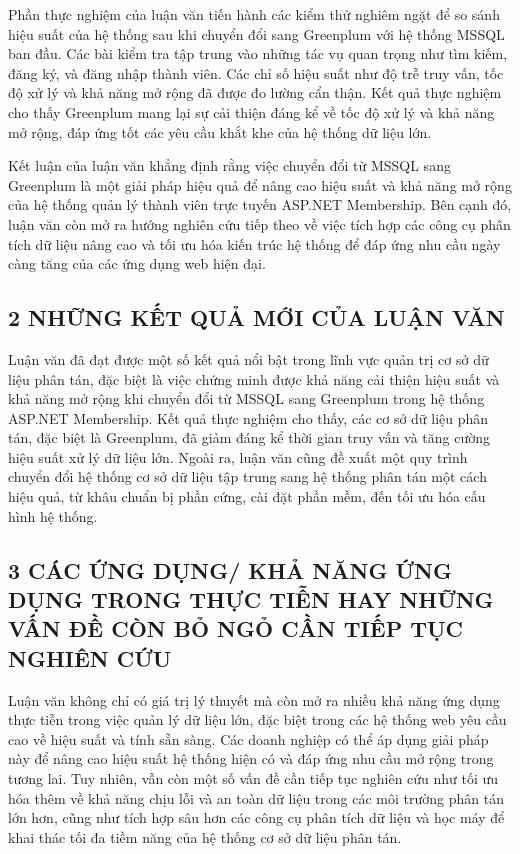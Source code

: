 \documentclass[50pt]{extarticle}
\begin{document}
Phần thực nghiệm của luận văn tiến hành các kiểm thử nghiêm ngặt để so sánh hiệu suất của hệ thống sau khi chuyển đổi sang Greenplum với hệ thống MSSQL ban đầu. Các bài kiểm tra tập trung vào những tác vụ quan trọng như tìm kiếm, đăng ký, và đăng nhập thành viên. Các chỉ số hiệu suất như độ trễ truy vấn, tốc độ xử lý và khả năng mở rộng đã được đo lường cẩn thận. Kết quả thực nghiệm cho thấy Greenplum mang lại sự cải thiện đáng kể về tốc độ xử lý và khả năng mở rộng, đáp ứng tốt các yêu cầu khắt khe của hệ thống dữ liệu lớn.

Kết luận của luận văn khẳng định rằng việc chuyển đổi từ MSSQL sang Greenplum là một giải pháp hiệu quả để nâng cao hiệu suất và khả năng mở rộng của hệ thống quản lý thành viên trực tuyến ASP.NET Membership. Bên cạnh đó, luận văn còn mở ra hướng nghiên cứu tiếp theo về việc tích hợp các công cụ phân tích dữ liệu nâng cao và tối ưu hóa kiến trúc hệ thống để đáp ứng nhu cầu ngày càng tăng của các ứng dụng web hiện đại.


\subsection*{2 NHỮNG KẾT QUẢ MỚI CỦA LUẬN VĂN}
Luận văn đã đạt được một số kết quả nổi bật trong lĩnh vực quản trị cơ sở dữ liệu phân tán, đặc biệt là việc chứng minh được khả năng cải thiện hiệu suất và khả năng mở rộng khi chuyển đổi từ MSSQL sang Greenplum trong hệ thống ASP.NET Membership. Kết quả thực nghiệm cho thấy, các cơ sở dữ liệu phân tán, đặc biệt là Greenplum, đã giảm đáng kể thời gian truy vấn và tăng cường hiệu suất xử lý dữ liệu lớn. Ngoài ra, luận văn cũng đề xuất một quy trình chuyển đổi hệ thống cơ sở dữ liệu tập trung sang hệ thống phân tán một cách hiệu quả, từ khâu chuẩn bị phần cứng, cài đặt phần mềm, đến tối ưu hóa cấu hình hệ thống.


\subsection*{3 CÁC ỨNG DỤNG/ KHẢ NĂNG ỨNG DỤNG TRONG THỰC TIỄN
HAY NHỮNG VẤN ĐỀ CÒN BỎ NGỎ CẦN TIẾP TỤC NGHIÊN CỨU}

Luận văn không chỉ có giá trị lý thuyết mà còn mở ra nhiều khả năng ứng dụng thực tiễn trong việc quản lý dữ liệu lớn, đặc biệt trong các hệ thống web yêu cầu cao về hiệu suất và tính sẵn sàng. Các doanh nghiệp có thể áp dụng giải pháp này để nâng cao hiệu suất hệ thống hiện có và đáp ứng nhu cầu mở rộng trong tương lai. Tuy nhiên, vẫn còn một số vấn đề cần tiếp tục nghiên cứu như tối ưu hóa thêm về khả năng chịu lỗi và an toàn dữ liệu trong các môi trường phân tán lớn hơn, cũng như tích hợp sâu hơn các công cụ phân tích dữ liệu và học máy để khai thác tối đa tiềm năng của hệ thống cơ sở dữ liệu phân tán.
\end{document}
